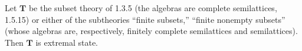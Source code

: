 Let $\mathbf{T}$ be the subset theory of 1.3.5 (the algebras are complete semilattices, 1.5.15) or either of the subtheories ``finite subsets,'' ``finite nonempty subsets'' (whose algebras are, respectively, finitely complete semilattices and semilattices). Then $\mathbf{T}$ is extremal state.

